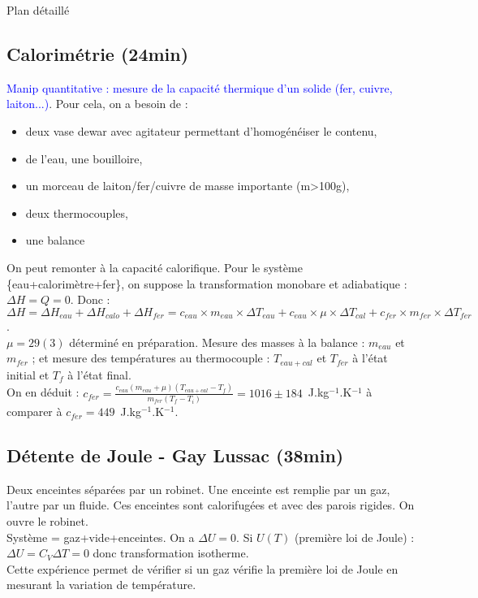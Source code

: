 \begin{reportBlock}{Plan détaillé}
  \subsection{Calorimétrie (24min)}
  \textcolor{blue}{Manip quantitative : mesure de la capacité thermique d'un solide (fer, cuivre, laiton...)}. Pour cela, on a besoin de :
  \begin{itemize}
      \item deux vase dewar avec agitateur permettant d'homogénéiser le contenu,
      \item de l'eau, une bouilloire,
      \item un morceau de laiton/fer/cuivre de masse importante (m>100g),
      \item deux thermocouples,
      \item une balance
  \end{itemize}
  On peut remonter à la capacité calorifique. Pour le système \{eau+calorimètre+fer\}, on suppose la transformation monobare et adiabatique : $\Delta H = Q = 0$. Donc : $\Delta H = \Delta H_{eau} + \Delta H_{calo} + \Delta H_{fer} = c_{eau}\times m_{eau}\times \Delta T_{eau} + c_{eau}\times \mu \times \Delta T_{cal} + c_{fer}\times m_{fer}\times \Delta T_{fer}$.\\
  $\mu =29(3)$ déterminé en préparation. Mesure des masses à la balance : $m_{eau}$ et $m_{fer}$ ; et mesure des températures au thermocouple : $T_{eau+cal}$ et $T_{fer}$ à l'état initial et  $T_f$ à l'état final.\\
  On en déduit : $c_{fer}=\frac{c_{eau}(m_{eau}+\mu)(T_{eau+cal}-T_f)}{m_{fer}(T_f-T_i)}=1016\pm 184$~J.kg$^{-1}$.K$^{-1}$ à comparer à $c_{fer}=449$~J.kg$^{-1}$.K$^{-1}$.\\
  
  \subsection{Détente de Joule - Gay Lussac (38min)}
  Deux enceintes séparées par un robinet. Une enceinte est remplie par un gaz, l'autre par un fluide. Ces enceintes sont calorifugées et avec des parois rigides. On ouvre le robinet. \\
  Système = {gaz+vide+enceintes}. On a $\Delta U=0$. Si $U(T)$ (première loi de Joule) : $\Delta U = C_{V}\Delta T = 0$ donc transformation isotherme. \\
  Cette expérience permet de vérifier si un gaz vérifie la première loi de Joule en mesurant la variation de température.
  

\end{reportBlock}
